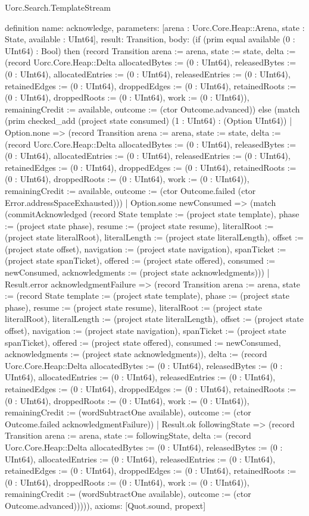 \begin{lexlean}{Uorc.Search.TemplateStream}
\begin{semanticmodule}
definition{
  name: acknowledge,
  parameters: [arena : Uorc.Core.Heap::Arena, state : State, available : UInt64],
  result: Transition,
  body: (if (prim equal available (0 : UInt64) : Bool) then (record Transition {arena := arena, state := state, delta := (record Uorc.Core.Heap::Delta {allocatedBytes := (0 : UInt64), releasedBytes := (0 : UInt64), allocatedEntries := (0 : UInt64), releasedEntries := (0 : UInt64), retainedEdges := (0 : UInt64), droppedEdges := (0 : UInt64), retainedRoots := (0 : UInt64), droppedRoots := (0 : UInt64), work := (0 : UInt64)}), remainingCredit := available, outcome := (ctor Outcome.advanced)}) else (match (prim checked_add (project state consumed) (1 : UInt64) : (Option UInt64))
    | Option.none => (record Transition {arena := arena, state := state, delta := (record Uorc.Core.Heap::Delta {allocatedBytes := (0 : UInt64), releasedBytes := (0 : UInt64), allocatedEntries := (0 : UInt64), releasedEntries := (0 : UInt64), retainedEdges := (0 : UInt64), droppedEdges := (0 : UInt64), retainedRoots := (0 : UInt64), droppedRoots := (0 : UInt64), work := (0 : UInt64)}), remainingCredit := available, outcome := (ctor Outcome.failed (ctor Error.addressSpaceExhausted))})
    | Option.some newConsumed => (match (commitAcknowledged (record State {template := (project state template), phase := (project state phase), resume := (project state resume), literalRoot := (project state literalRoot), literalLength := (project state literalLength), offset := (project state offset), navigation := (project state navigation), spanTicket := (project state spanTicket), offered := (project state offered), consumed := newConsumed, acknowledgments := (project state acknowledgments)}))
      | Result.error acknowledgmentFailure => (record Transition {arena := arena, state := (record State {template := (project state template), phase := (project state phase), resume := (project state resume), literalRoot := (project state literalRoot), literalLength := (project state literalLength), offset := (project state offset), navigation := (project state navigation), spanTicket := (project state spanTicket), offered := (project state offered), consumed := newConsumed, acknowledgments := (project state acknowledgments)}), delta := (record Uorc.Core.Heap::Delta {allocatedBytes := (0 : UInt64), releasedBytes := (0 : UInt64), allocatedEntries := (0 : UInt64), releasedEntries := (0 : UInt64), retainedEdges := (0 : UInt64), droppedEdges := (0 : UInt64), retainedRoots := (0 : UInt64), droppedRoots := (0 : UInt64), work := (0 : UInt64)}), remainingCredit := (wordSubtractOne available), outcome := (ctor Outcome.failed acknowledgmentFailure)})
      | Result.ok followingState => (record Transition {arena := arena, state := followingState, delta := (record Uorc.Core.Heap::Delta {allocatedBytes := (0 : UInt64), releasedBytes := (0 : UInt64), allocatedEntries := (0 : UInt64), releasedEntries := (0 : UInt64), retainedEdges := (0 : UInt64), droppedEdges := (0 : UInt64), retainedRoots := (0 : UInt64), droppedRoots := (0 : UInt64), work := (0 : UInt64)}), remainingCredit := (wordSubtractOne available), outcome := (ctor Outcome.advanced)})))),
  axioms: [Quot.sound, propext]
}


\end{semanticmodule}
\end{lexlean}
